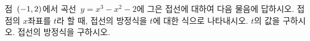점~$(-1{,}\mkern3mu\mathopen{}2)$에서 곡선~$y=x^3-x^2-2$에 그은 접선에 대하여 다음 물음에 답하시오.
 접점의 $x$좌표를 $t$라 할 때, 접선의 방정식을 $t$에 대한 식으로 나타내시오.
 $t$의 값을 구하시오.
 접선의 방정식을 구하시오.

